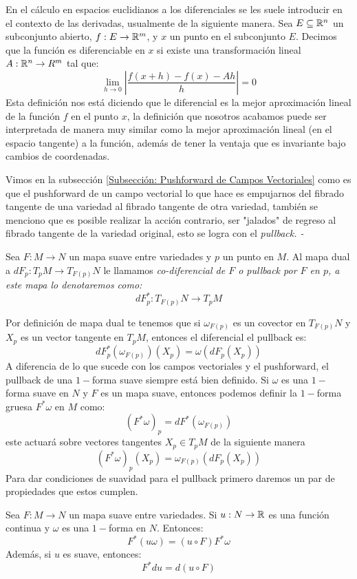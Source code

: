 En el cálculo en espacios euclidianos a los diferenciales se les suele introducir en el contexto de las derivadas, usualmente de la siguiente manera. Sea $E \subseteq \mathbb{R}^n$ un subconjunto abierto, $f: E \to \mathbb{R}^m$, y $x$ un punto en el subconjunto $E$. Decimos que la función es diferenciable en $x$ si existe una transformación lineal $A: \mathbb{R}^n \to R^m$ tal que:
\[
	\lim_{h \to 0} \left| \frac{f(x+h) - f(x) - Ah}{h} \right| = 0
\]
Esta definición nos está diciendo que le diferencial es la mejor aproximación lineal de la función $f$ en el punto $x$, la definición que nosotros acabamos puede ser interpretada de manera muy similar como la mejor aproximación lineal (en el espacio tangente) a la función, además de tener la ventaja que es invariante bajo cambios de coordenadas.

Vimos en la subsección \ref{Subsección: Pushforward de Campos Vectoriales} como es que el pushforward de un campo vectorial lo que hace es empujarnos del fibrado tangente de una variedad al fibrado tangente de otra variedad, también se menciono que es posible realizar la acción contrario, ser "jalados" de regreso al fibrado tangente de la variedad original, esto se logra con el \it{pullback}.
-
\begin{definition}[Pullback]
	Sea $F: M \to N$ un mapa suave entre variedades y $p$ un punto en $M$. Al mapa dual a $dF_p: T_pM \to T_{F(p)}N$ le llamamos \it{co-diferencial de $F$} o \it{pullback por $F$ en $p$}, a este mapa lo denotaremos como:
	\[
		dF_p^*: T_{F(p)}N \to T_pM
	\]
\end{definition}

Por definición de mapa dual te tenemos que si $\omega_{F(p)}$ es un covector en $T_{F(p)}N$ y $X_p$ es un vector tangente en $T_pM$, entonces el diferencial el pullback es:
\[
	dF_{p}^{*}(\omega_{F(p)})(X_p) = \omega(dF_p(X_p))
\]
A diferencia de lo que sucede con los campos vectoriales y el pushforward, el pullback de una  $1-$forma suave siempre está bien definido. Si $\omega$ es una $1-$forma suave en $N$ y $F$ es un mapa suave, entonces podemos definir la $1-$forma gruesa $F^* \omega$ en $M$ como:
\[
	(F^*\omega)_p = dF^* (\omega_{F(p)})
\]
este actuará sobre vectores tangentes $X_p \in T_pM$ de la siguiente manera
\[
	(F^*\omega)_p(X_p) = \omega_{F(p)}(dF_p(X_p))
\]
Para dar condiciones de suavidad para el pullback primero daremos un par de propiedades que estos cumplen.
\begin{lemma}
	Sea $F: M \to N$ un mapa suave entre variedades. Si $u: N \to \mathbb{R}$ es una función continua y $\omega$ es una $1-$forma en $N$. Entonces:
	\[
		F^{*}(u \omega) = (u \circ F) F^*\omega
	\]
	Además, si $u$ es suave, entonces:
	\[
		F^* du = d(u \circ F)
	\]
\end{lemma}


